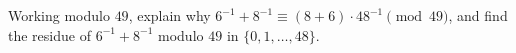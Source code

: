 Working modulo $49$, explain why $6^{-1}+8^{-1}\equiv(8+6)\cdot48^{-1}\pmod{49}$, and find the residue of $6^{-1}+8^{-1}$ modulo $49$ in $\{0,1,\dots,48\}$.
